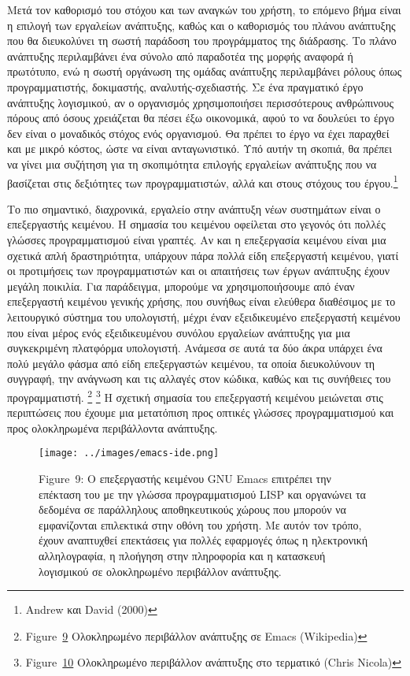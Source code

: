 \documentclass[
]{article}
\begin{document}
Μετά τον καθορισμό του στόχου και των αναγκών του χρήστη, το επόμενο
βήμα είναι η επιλογή των εργαλείων ανάπτυξης, καθώς και ο καθορισμός του
πλάνου ανάπτυξης που θα διευκολύνει τη σωστή παράδοση του προγράμματος
της διάδρασης. Το πλάνο ανάπτυξης περιλαμβάνει ένα σύνολο από παραδοτέα
της μορφής αναφορά ή πρωτότυπο, ενώ η σωστή οργάνωση της ομάδας
ανάπτυξης περιλαμβάνει ρόλους όπως προγραμματιστής, δοκιμαστής,
αναλυτής-σχεδιαστής. Σε ένα πραγματικό έργο ανάπτυξης λογισμικού, αν ο
οργανισμός χρησιμοποιήσει περισσότερους ανθρώπινους πόρους από όσους
χρειάζεται θα πέσει έξω οικονομικά, αφού το να δουλεύει το έργο δεν
είναι ο μοναδικός στόχος ενός οργανισμού. Θα πρέπει το έργο να έχει
παραχθεί και με μικρό κόστος, ώστε να είναι ανταγωνιστικό. Υπό αυτήν τη
σκοπιά, θα πρέπει να γίνει μια συζήτηση για τη σκοπιμότητα επιλογής
εργαλείων ανάπτυξης που να βασίζεται στις δεξιότητες των
προγραμματιστών, αλλά και στους στόχους του έργου.\footnote{Andrew και
  David (2000)}

Το πιο σημαντικό, διαχρονικά, εργαλείο στην ανάπτυξη νέων συστημάτων
είναι ο επεξεργαστής κειμένου. Η σημασία του κειμένου οφείλεται στο
γεγονός ότι πολλές γλώσσες προγραμματισμού είναι γραπτές. Αν και η
επεξεργασία κειμένου είναι μια σχετικά απλή δραστηριότητα, υπάρχουν πάρα
πολλά είδη επεξεργαστή κειμένου, γιατί οι προτιμήσεις των
προγραμματιστών και οι απαιτήσεις των έργων ανάπτυξης έχουν μεγάλη
ποικιλία. Για παράδειγμα, μπορούμε να χρησιμοποιήσουμε από έναν
επεξεργαστή κειμένου γενικής χρήσης, που συνήθως είναι ελεύθερα
διαθέσιμος με το λειτουργικό σύστημα του υπολογιστή, μέχρι έναν
εξειδικευμένο επεξεργαστή κειμένου που είναι μέρος ενός εξειδικευμένου
συνόλου εργαλείων ανάπτυξης για μια συγκεκριμένη πλατφόρμα υπολογιστή.
Ανάμεσα σε αυτά τα δύο άκρα υπάρχει ένα πολύ μεγάλο φάσμα από είδη
επεξεργαστών κειμένου, τα οποία διευκολύνουν τη συγγραφή, την ανάγνωση
και τις αλλαγές στον κώδικα, καθώς και τις συνήθειες του προγραμματιστή.
\footnote{Figure~\protect\hyperlink{fig:emacs-ide}{9} Ολοκληρωμένο
  περιβάλλον ανάπτυξης σε Emacs (Wikipedia)} \footnote{Figure~\protect\hyperlink{fig:vim-ide}{10}
  Ολοκληρωμένο περιβάλλον ανάπτυξης στο τερματικό (Chris Nicola)} Η
σχετική σημασία του επεξεργαστή κειμένου μειώνεται στις περιπτώσεις που
έχουμε μια μετατόπιση προς οπτικές γλώσσες προγραμματισμού και προς
ολοκληρωμένα περιβάλλοντα ανάπτυξης.

\leavevmode{}%
\begin{figure}
\hypertarget{fig:emacs-ide}{%
\centering
\texttt{[image: ../images/emacs-ide.png]}
\caption{Figure~9: Ο επεξεργαστής κειμένου GNU Emacs επιτρέπει την
επέκταση του με την γλώσσα προγραμματισμού LISP και οργανώνει τα
δεδομένα σε παράλληλους αποθηκευτικούς χώρους που μπορούν να
εμφανίζονται επιλεκτικά στην οθόνη του χρήστη. Με αυτόν τον τρόπο, έχουν
αναπτυχθεί επεκτάσεις για πολλές εφαρμογές όπως η ηλεκτρονική
αλληλογραφία, η πλοήγηση στην πληροφορία και η κατασκευή λογισμικού σε
ολοκληρωμένο περιβάλλον ανάπτυξης.}\label{fig:emacs-ide}
}
\end{figure}
\end{document}
